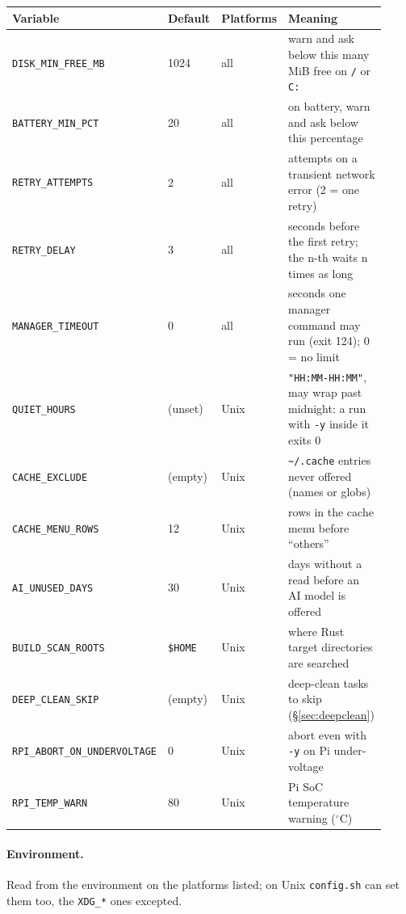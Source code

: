 \documentclass[11pt,a4paper]{article}
\begin{document}
\begin{center}
\begin{longtable}{@{}p{0.34\linewidth} p{0.12\linewidth} p{0.12\linewidth} p{0.34\linewidth}@{}}
\toprule
\textbf{Variable} & \textbf{Default} & \textbf{Platforms} & \textbf{Meaning} \\
\midrule \endhead
\texttt{DISK\_MIN\_FREE\_MB}         & 1024     & all  & warn and ask below this many MiB free on \texttt{/} or \texttt{C:} \\
\texttt{BATTERY\_MIN\_PCT}           & 20       & all  & on battery, warn and ask below this percentage \\
\texttt{RETRY\_ATTEMPTS}             & 2        & all  & attempts on a transient network error (2 = one retry) \\
\texttt{RETRY\_DELAY}                & 3        & all  & seconds before the first retry; the n-th waits n times as long \\
\texttt{MANAGER\_TIMEOUT}            & 0        & all  & seconds one manager command may run (exit 124); 0 = no limit \\
\texttt{QUIET\_HOURS}                & (unset)  & Unix & \texttt{"HH:MM-HH:MM"}, may wrap past midnight: a run with \texttt{-y} inside it exits 0 \\
\texttt{CACHE\_EXCLUDE}              & (empty)  & Unix & \verb|~/.cache| entries never offered (names or globs) \\
\texttt{CACHE\_MENU\_ROWS}           & 12       & Unix & rows in the cache menu before ``others'' \\
\texttt{AI\_UNUSED\_DAYS}            & 30       & Unix & days without a read before an AI model is offered \\
\texttt{BUILD\_SCAN\_ROOTS}          & \verb|$HOME| & Unix & where Rust target directories are searched \\
\texttt{DEEP\_CLEAN\_SKIP}           & (empty)  & Unix & deep-clean tasks to skip (\S\ref{sec:deepclean}) \\
\texttt{RPI\_ABORT\_ON\_UNDERVOLTAGE} & 0       & Unix & abort even with \texttt{-y} on Pi under-voltage \\
\texttt{RPI\_TEMP\_WARN}             & 80       & Unix & Pi SoC temperature warning ($^\circ$C) \\
\bottomrule
\end{longtable}
\end{center}

\paragraph{Environment.} Read from the environment on the platforms listed; on
Unix \texttt{config.sh} can set them too, the \texttt{XDG\_*} ones excepted.
\end{document}
